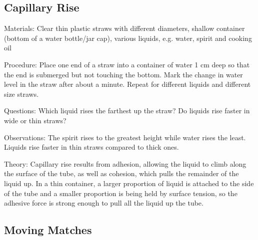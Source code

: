 \begin{multicols}{2}
\subsection{Capillary Rise}
\begin{description*}
\item[Materials:]{Clear thin plastic straws with different diameters, shallow container (bottom of a water bottle/jar cap), various liquids, e.g. water, spirit and cooking oil}
\item[Procedure:]{Place one end of a straw into a container of water 1 cm deep so that the end is submerged but not touching the bottom. Mark the change in water level in the straw after about a minute. Repeat for different liquids and different size straws.}
\item[Questions:]{Which liquid rises the farthest up the straw? Do liquids rise faster in wide or thin straws?}
\item[Observations:]{The spirit rises to the greatest height while water rises the least. Liquids rise faster in thin straws compared to thick ones.}
\item[Theory:]{Capillary rise results from adhesion, allowing the liquid to climb along the surface of the tube, as well as cohesion, which pulls the remainder of the liquid up. In a thin container, a larger proportion of liquid is attached to the side of the tube and a smaller proportion is being held by surface tension, so the adhesive force is strong enough to pull all the liquid up the tube.}
\end{description*}

\subsection{Moving Matches}



\end{multicols}
